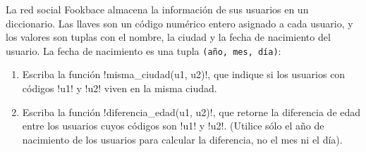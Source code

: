 La red social Fookbace almacena la información de sus usuarios
en un diccionario.
Las llaves son un código numérico entero asignado a cada usuario, y
los valores son tuplas con el nombre, la ciudad y la fecha de nacimiento del usuario.
La fecha de nacimiento es una tupla \texttt{(año, mes, día)}:

\begin{enumerate}
  \item Escriba la función \li!misma_ciudad(u1, u2)!,
    que indique si los usuarios con códigos \li!u1! y \li!u2!
    viven en la misma ciudad.
    
  \item Escriba la función \li!diferencia_edad(u1, u2)!,
    que retorne la diferencia de edad entre los usuarios
    cuyos códigos son \li!u1! y \li!u2!.
    (Utilice sólo el año de nacimiento de los usuarios
    para calcular la diferencia, no el mes ni el día).
    
\end{enumerate}

